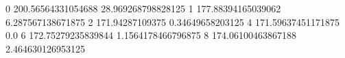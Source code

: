 0 200.56564331054688 28.969268798828125
1 177.88394165039062 6.287567138671875
2 171.94287109375 0.34649658203125
4 171.59637451171875 0.0
6 172.75279235839844 1.1564178466796875
8 174.06100463867188 2.464630126953125
